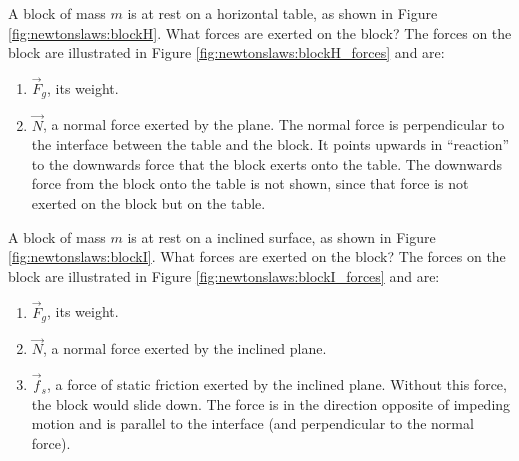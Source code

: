 \begin{example}{
A block of mass $m$ is at rest on a horizontal table, as shown in Figure \ref{fig:newtonslaws:blockH}. What forces are exerted on the block? }
The forces on the block are illustrated in Figure \ref{fig:newtonslaws:blockH_forces} and are:
\begin{enumerate}
\item $\vec F_g$, its weight.
\item $\vec N$, a normal force exerted by the plane. The normal force is perpendicular to the interface between the table and the block. It points upwards in ``reaction'' to the downwards force that the block exerts onto the table. The downwards force from the block onto the table is not shown, since that force is not exerted on the block but on the table.
\end{enumerate}
\end{example}
\newpage
\begin{example}{\label{ex:newtonslaws:blockI} A block of mass $m$ is at rest on a inclined surface, as shown in Figure \ref{fig:newtonslaws:blockI}. What forces are exerted on the block?}
The forces on the block are illustrated in Figure \ref{fig:newtonslaws:blockI_forces} and are:
\begin{enumerate}
\item $\vec F_g$, its weight.
\item $\vec N$, a normal force exerted by the inclined plane.
\item $\vec f_s$, a force of static friction exerted by the inclined plane. Without this force, the block would slide down. The force is in the direction opposite of impeding motion and is parallel to the interface (and perpendicular to the normal force).
\end{enumerate}
\end{example}
\vspace{-0.25cm}
